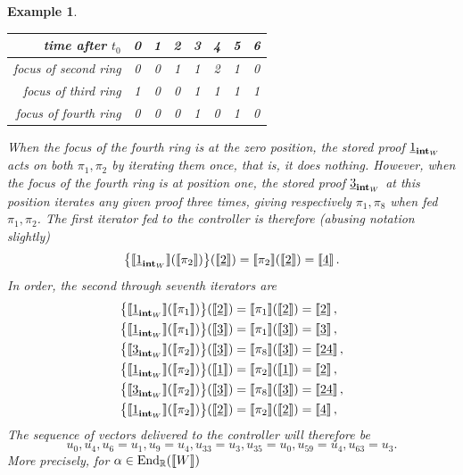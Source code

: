 \documentclass[english,letter paper,12pt,leqno]{article}
\theoremstyle{example}
\newtheorem{example}[theorem]{Example}
\numberwithin{equation}{section}
\DeclareMathOperator{\End}{End}
\begin{document}
\begin{example}
\begin{center}
\begin{tabular}{|r|c|c|c|c|c|c|c|}
\hline
time after $t_0$ & 0 & 1 & 2 & 3 & 4 & 5 & 6\\
\hline
focus of second ring & 0 & 0 & 1 & 1 & 2 & 1 & 0\\
\hline
focus of third ring & 1 & 0 & 0 & 1 & 1 & 1 & 1\\
\hline
focus of fourth ring & 0 & 0 & 0 & 1 & 0 & 1 & 0\\
\hline
\end{tabular}
\end{center}
When the focus of the fourth ring is at the zero position, the stored proof $\underline{1}_{\textbf{int}_W}$ acts on both $\pi_1, \pi_2$ by iterating them once, that is, it does nothing. However, when the focus of the fourth ring is at position one, the stored proof $\underline{3}_{\textbf{int}_W}$ at this position iterates any given proof three times, giving respectively $\pi_1, \pi_8$ when fed $\pi_1, \pi_2$. The first iterator fed to the controller is therefore (abusing notation slightly)
\[
\big\{ \llbracket \underline{1}_{\textbf{int}_W} \rrbracket( \llbracket \pi_2 \rrbracket ) \big\}( \llbracket \underline{2} \rrbracket ) = \llbracket \pi_2 \rrbracket( \llbracket \underline{2} \rrbracket ) = \llbracket \underline{4} \rrbracket\,.
\]
In order, the second through seventh iterators are
\begin{align*}
\big\{ \llbracket \underline{1}_{\textbf{int}_W} \rrbracket( \llbracket \pi_1 \rrbracket ) \big\}( \llbracket \underline{2} \rrbracket ) &= \llbracket \pi_1 \rrbracket( \llbracket \underline{2} \rrbracket ) = \llbracket \underline{2} \rrbracket\,,\\
\big\{ \llbracket \underline{1}_{\textbf{int}_W} \rrbracket( \llbracket \pi_1 \rrbracket ) \big\}( \llbracket \underline{3} \rrbracket ) &= \llbracket \pi_1 \rrbracket( \llbracket \underline{3} \rrbracket ) = \llbracket \underline{3} \rrbracket\,,\\
\big\{ \llbracket \underline{3}_{\textbf{int}_W} \rrbracket( \llbracket \pi_2 \rrbracket ) \big\}( \llbracket \underline{3} \rrbracket ) &= \llbracket \pi_8 \rrbracket( \llbracket \underline{3} \rrbracket ) = \llbracket \underline{24} \rrbracket\,,\\
\big\{ \llbracket \underline{1}_{\textbf{int}_W} \rrbracket( \llbracket \pi_2 \rrbracket ) \big\}( \llbracket \underline{1} \rrbracket ) &= \llbracket \pi_2 \rrbracket( \llbracket \underline{1} \rrbracket ) = \llbracket \underline{2} \rrbracket\,,\\
\big\{ \llbracket \underline{3}_{\textbf{int}_W} \rrbracket( \llbracket \pi_2 \rrbracket ) \big\}( \llbracket \underline{3} \rrbracket ) &= \llbracket \pi_8 \rrbracket( \llbracket \underline{3} \rrbracket ) = \llbracket \underline{24} \rrbracket\,,\\
\big\{ \llbracket \underline{1}_{\textbf{int}_W} \rrbracket( \llbracket \pi_2 \rrbracket ) \big\}( \llbracket \underline{2} \rrbracket ) &= \llbracket \pi_2 \rrbracket( \llbracket \underline{2} \rrbracket ) = \llbracket \underline{4} \rrbracket\,,
\end{align*}
The sequence of vectors delivered to the controller will therefore be 
\[
u_0, u_4, u_6 = u_1, u_9 = u_4, u_{33} = u_3, u_{35} = u_0, u_{59} = u_4, u_{63} = u_3.
\]
More precisely, for $\alpha \in \End_{\mathbb{R}}(\den{W})$

\end{example}
\end{document}

